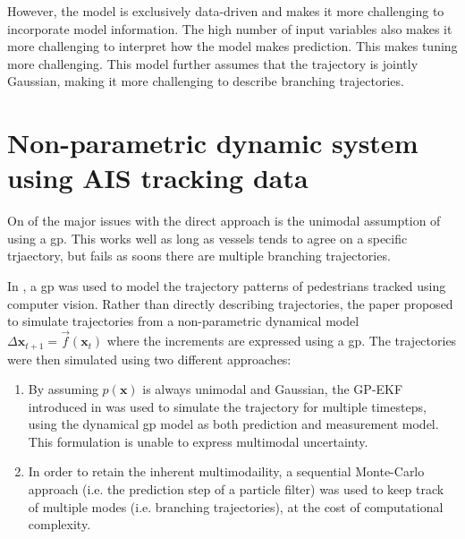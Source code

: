 However, the model is exclusively data-driven and makes it more challenging to incorporate model information. The high number of input variables also makes it more challenging to interpret how the model makes prediction. This makes tuning more challenging. This model further assumes that the trajectory is jointly Gaussian, making it more challenging to describe branching trajectories.

\section{Non-parametric dynamic system using AIS tracking data}
On of the major issues with the direct approach is the unimodal assumption of using a \acrshort{gp}. This works well as long as vessels tends to agree on a specific trjaectory, but fails as soons there are multiple branching trajectories.

In \cite{pedestrian}, a \acrshort{gp} was used to model the trajectory patterns of pedestrians tracked using computer vision. Rather than directly describing trajectories, the paper proposed to simulate trajectories from a non-parametric dynamical model $\Delta\boldsymbol{x}_{t+1} = \vec{f}(\boldsymbol{x}_t)$ where the increments are expressed using a \acrshort{gp}. The trajectories were then simulated using two different approaches: 
\begin{enumerate}
    \item By assuming $p(\boldsymbol{x})$ is always unimodal and Gaussian, the GP-EKF introduced in \cite{gpekf} was used to simulate the trajectory for multiple timesteps, using the dynamical \acrshort{gp} model as both prediction and measurement model. This formulation is unable to express multimodal uncertainty.
    \item In order to retain the inherent multimodaility, a sequential Monte-Carlo approach (i.e. the prediction step of a particle filter) was used to keep track of multiple modes (i.e. branching trajectories), at the cost of computational complexity. 
\end{enumerate}

